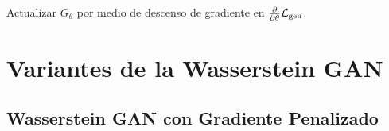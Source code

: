{{\begin{algorithm}[ht!]
\begin{algorithmic}[1]
        \State Actualizar $G_\theta$ por medio de descenso de gradiente en $\pdv{\theta} \mathcal{L}_{\mathrm{gen}}$.
        \EndWhile
    \end{algorithmic}
\end{algorithm}

}  %

\section{Variantes de la Wasserstein GAN}\label{sec:variantes-de-la-Wasserstein-GAN}
{
    \subsection{Wasserstein GAN con Gradiente Penalizado}\label{ssec:}
    {

    }  %
}  %
{

}  %
}  %
